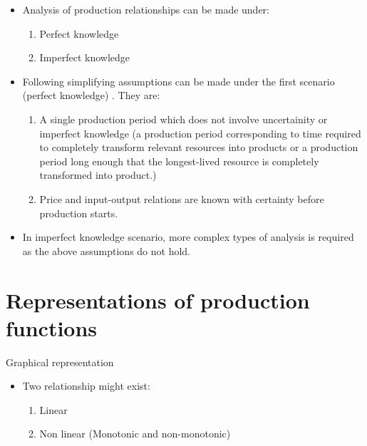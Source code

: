 \documentclass[12pt,ignorenonframetext,aspectratio=169]{beamer}
\providecommand{\tightlist}{%
  \setlength{\itemsep}{0pt}\setlength{\parskip}{0pt}}
\begin{document}
\begin{frame}{}
\protect\hypertarget{section-10}{}

\begin{itemize}
\tightlist
\item
  Analysis of production relationships can be made under:

  \begin{enumerate}
  \tightlist
  \item
    Perfect knowledge
  \item
    Imperfect knowledge
  \end{enumerate}
\item
  Following simplifying assumptions can be made under the first scenario
  (perfect knowledge) . They are:

  \begin{enumerate}
  \tightlist
  \item
    A single production period which does not involve uncertainity or
    imperfect knowledge (a production period corresponding to time
    required to completely transform relevant resources into products or
    a production period long enough that the longest-lived resource is
    completely transformed into product.)
  \item
    Price and input-output relations are known with certainty before
    production starts.
  \end{enumerate}
\item
  In imperfect knowledge scenario, more complex types of analysis is
  required as the above assumptions do not hold.
\end{itemize}

\end{frame}

\hypertarget{representations-of-production-functions}{%
\section{Representations of production
functions}\label{representations-of-production-functions}}

\begin{frame}{Graphical representation}
\protect\hypertarget{graphical-representation}{}

\begin{itemize}
\tightlist
\item
  Two relationship might exist:

  \begin{enumerate}
  \tightlist
  \item
    Linear
  \item
    Non linear (Monotonic and non-monotonic)
  \end{enumerate}
\end{itemize}

\end{frame}
\end{document}
